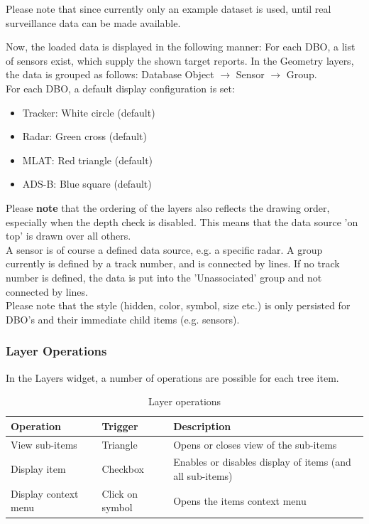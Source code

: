 {Please note that since currently only an example dataset is used, until real surveillance data can be made available.

Now, the loaded data is displayed in the following manner: For each DBO, a list of sensors exist, which supply the shown target reports. In the Geometry layers, the data is grouped as follows: Database Object $\rightarrow$ Sensor $\rightarrow$ Group. \\

For each DBO, a default display configuration is set:

\begin{itemize}
 \item Tracker: White circle (default)
 \item Radar: Green cross (default)
 \item MLAT: Red triangle (default)
 \item ADS-B: Blue square (default)
\end{itemize}

Please \textbf{note} that the ordering of the layers also reflects the drawing order, especially when the depth check is disabled. This means that the data source 'on top' is drawn over all others. \\

A sensor is of course a defined data source, e.g. a specific radar. A group currently is defined by a track number, and is connected by lines. If no track number is defined, the data is put into the 'Unassociated' group and not connected by lines. \\

Please note that the style (hidden, color, symbol, size etc.) is only persisted for DBO's and their immediate child items (e.g. sensors). 

\subsubsection{Layer Operations}

In the Layers widget, a number of operations are possible for each tree item.

\begin{table}[H]
  \center
  \begin{tabular}{ | l | l | l |}
    \hline
    \textbf{Operation} & \textbf{Trigger} &  \textbf{Description} \\ \hline
    View sub-items & Triangle & Opens or closes view of the sub-items \\ \hline
    Display item & Checkbox & Enables or disables display of items (and all sub-items) \\ \hline
    Display context menu & Click on symbol & Opens the items context menu \\ \hline
  \end{tabular}
  \caption{Layer operations}
\end{table}

}
